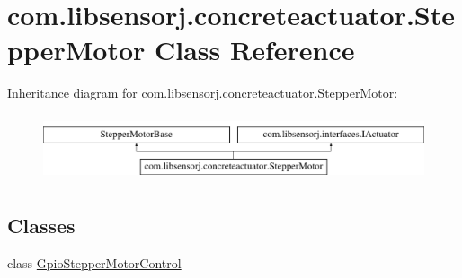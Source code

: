 \hypertarget{classcom_1_1libsensorj_1_1concreteactuator_1_1StepperMotor}{}\section{com.\+libsensorj.\+concreteactuator.\+Stepper\+Motor Class Reference}
\label{classcom_1_1libsensorj_1_1concreteactuator_1_1StepperMotor}
Inheritance diagram for com.\+libsensorj.\+concreteactuator.\+Stepper\+Motor\+:\begin{figure}[H]
\begin{center}
\leavevmode
\includegraphics[height=1.985816cm]{classcom_1_1libsensorj_1_1concreteactuator_1_1StepperMotor}
\end{center}
\end{figure}
\subsection*{Classes}
\begin{DoxyCompactItemize}
\item 
class \hyperlink{classcom_1_1libsensorj_1_1concreteactuator_1_1StepperMotor_1_1GpioStepperMotorControl}{Gpio\+Stepper\+Motor\+Control}
\end{DoxyCompactItemize}
